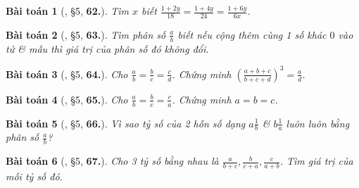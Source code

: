 \documentclass{article}
\numberwithin{equation}{section}
\newtheorem{baitoan}{Bài toán}
\begin{document}
\begin{baitoan}[\cite{Binh_Toan_7_tap_1}, \S5, \textbf{62.}]
	Tìm $x$ biết $\frac{1 + 2y}{18} = \frac{1 + 4y}{24} = \frac{1 + 6y}{6x}$.
\end{baitoan}

\begin{baitoan}[\cite{Binh_Toan_7_tap_1}, \S5, \textbf{63.}]
	Tìm phân số $\frac{a}{b}$ biết nếu cộng thêm cùng 1 số khác $0$ vào tử \& mẫu thì giá trị của phân số đó không đổi.
\end{baitoan}

\begin{baitoan}[\cite{Binh_Toan_7_tap_1}, \S5, \textbf{64.}]
	Cho $\frac{a}{b} = \frac{b}{c} = \frac{c}{d}$. Chứng minh $\left(\frac{a + b + c}{b + c + d}\right)^3 = \frac{a}{d}$.
\end{baitoan}

\begin{baitoan}[\cite{Binh_Toan_7_tap_1}, \S5, \textbf{65.}]
	Cho $\frac{a}{b} = \frac{b}{c} = \frac{c}{a}$. Chứng minh $a = b = c$.
\end{baitoan}

\begin{baitoan}[\cite{Binh_Toan_7_tap_1}, \S5, \textbf{66.}]
	Vì sao tỷ số của 2 hỗn số dạng $a\frac{1}{b}$ \& $b\frac{1}{a}$ luôn luôn bằng phân số $\frac{a}{b}$?
\end{baitoan}

\begin{baitoan}[\cite{Binh_Toan_7_tap_1}, \S5, \textbf{67.}]
	Cho 3 tỷ số bằng nhau là $\frac{a}{b + c},\frac{b}{c + a},\frac{c}{a + b}$. Tìm giá trị của mỗi tỷ số đó.
\end{baitoan}

\end{document}
